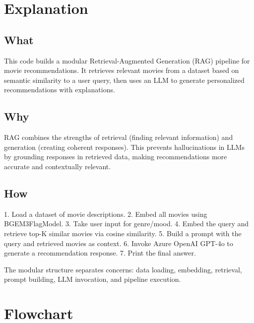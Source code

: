 \documentclass[11pt, a4paper]{article}
\begin{document}
\section{Explanation}

\subsection{What}
This code builds a modular Retrieval-Augmented Generation (RAG) pipeline for movie recommendations. It retrieves relevant movies from a dataset based on semantic similarity to a user query, then uses an LLM to generate personalized recommendations with explanations.

\subsection{Why}
RAG combines the strengths of retrieval (finding relevant information) and generation (creating coherent responses). This prevents hallucinations in LLMs by grounding responses in retrieved data, making recommendations more accurate and contextually relevant.

\subsection{How}
1. Load a dataset of movie descriptions.
2. Embed all movies using BGEM3FlagModel.
3. Take user input for genre/mood.
4. Embed the query and retrieve top-K similar movies via cosine similarity.
5. Build a prompt with the query and retrieved movies as context.
6. Invoke Azure OpenAI GPT-4o to generate a recommendation response.
7. Print the final answer.

The modular structure separates concerns: data loading, embedding, retrieval, prompt building, LLM invocation, and pipeline execution.

\section{Flowchart}

\end{document}
